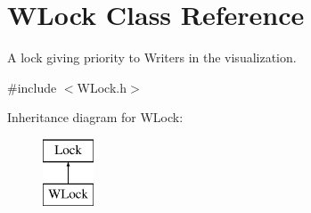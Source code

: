 \hypertarget{class_w_lock}{}\section{W\+Lock Class Reference}
\label{class_w_lock}


A lock giving priority to Writers in the visualization.  




{\ttfamily \#include $<$W\+Lock.\+h$>$}

Inheritance diagram for W\+Lock\+:\begin{figure}[H]
\begin{center}
\leavevmode
\includegraphics[height=2.000000cm]{class_w_lock}
\end{center}
\end{figure}
